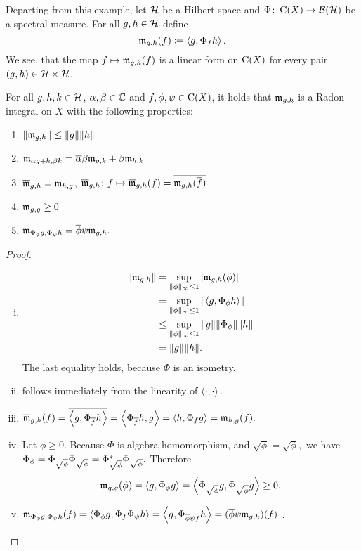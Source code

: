 Departing from this example, let $\mathcal{H}$ be a Hilbert space and 
$\Phi\colon \operatorname{C}(X) \to \mathcal{B}(\mathcal{H})$
be a spectral measure.
For all $g , h \in \mathcal{H}$ define
\[
 \mathfrak{m}_{g, h} (f) \coloneqq \left\langle g, \Phi_f h \right\rangle.
\]
We see, that the map $
 f \mapsto \mathfrak{m}_{g,h} (f)$
is a linear form on $\operatorname{C} (X)$ for every pair $(g, h) \in \mathcal{H} \times \mathcal{H}$.
\begin{thrm} \label{measureproperties}
For all $g, h,k \in \mathcal{H}$, $\alpha, \beta \in \mathbb{C}$ and $f, \phi, \psi \in 
\operatorname{C}(X)$, it holds that $\mathfrak{m}_{g,h}$ is a Radon integral on $X$ with the following 
properties:
\begin{enumerate}[{(}i{)}]
 \item $\| \mathfrak{m}_{g,h}\| \leq \|g\| \|h\|$
 \item $\mathfrak{m}_{\alpha g + h, \beta k} = \overline{\alpha}\beta \mathfrak{m}_{g,k} + 
 \beta \mathfrak{m}_{h,k}$
 \item $\overline{\mathfrak{m}}_{g,h} = \mathfrak{m}_{h,g}$, $\overline{\mathfrak{m}}_{g,h} \colon 
 f \mapsto \overline{\mathfrak{m}}_{g,h}(f) = \overline{\mathfrak{m}_{g,h}(\overline{f})}$
 \item $\mathfrak{m}_{g,g} \geq 0$
 \item $\mathfrak{m}_{\Phi_\phi g, \Phi_\psi h} = \overline{\phi} \psi \mathfrak{m}_{g,h}.$
\end{enumerate}

\end{thrm}

\begin{proof}
 \begin{enumerate}[(i)]
  \item \begin{align*}
         \| \mathfrak{m}_{g,h} \| &= \sup\limits_{\| \phi \| _\infty \leq 1} | \mathfrak{m}_{g,h}(\phi) | \\
			&= \sup\limits_{\| \phi \| _\infty \leq 1} | \left\langle g, \Phi_\phi h \right\rangle | \\
			&\leq \sup\limits_{\| \phi \| _\infty \leq 1} \| g \| \|\Phi_\phi \| \| h\| \\
			&= \|g\| \|h\|.
        \end{align*}
  The last equality holds, because $\Phi$ is an isometry.
 \item follows immediately from the linearity of $\left\langle \cdot , \cdot \right\rangle.$
 
 \item $\overline{\mathfrak{m}}_{g,h}(f) = \overline{\left\langle g, \Phi_{\overline{f}}h \right\rangle} = 
 \left\langle \Phi_{\overline{f}}h ,g \right\rangle =\left\langle h,\Phi_{f}g \right\rangle = \mathfrak{m}_{h,g}(f).$
	
       \item Let $\phi \geq 0$. Because $\Phi$ is algebra homomorphism, and 
       $\overline{\sqrt{\phi}} = \sqrt{\phi},$ we have 
	$ \Phi_\phi = \Phi_{\sqrt{\phi}} \Phi_{\sqrt{\phi}} =
	  \Phi^{*}_{\sqrt{\phi}} \Phi_{\sqrt{\phi}}.$
	Therefore 
	\[\mathfrak{m}_{g,g}(\phi) = \left\langle g, \Phi_\phi g \right\rangle = \left\langle \Phi_{\sqrt{\phi}}g,
	\Phi_{\sqrt{\phi}}g \right\rangle \geq 0. \]
	
 \item	$\mathfrak{m}_{\Phi_\phi g, \Phi_\psi h} (f ) = \left\langle \Phi_\phi g, \Phi_f 
	\Phi_\psi h \right\rangle = \left\langle g , \Phi_{\overline{\phi} \psi f} h  \right\rangle = (\overline{\phi}
      \psi \mathfrak{m}_{g,h})(f)$ .

\end{enumerate}

\end{proof}

